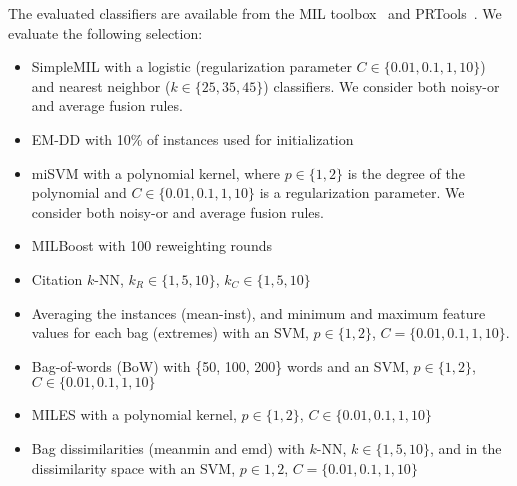 \documentclass[10pt,conference,a4paper]{IEEEtran}
\begin{document}
The evaluated classifiers are available from the MIL toolbox~\cite{MIL2011} and PRTools~\cite{prtools}. We evaluate the following selection:

\begin{itemize}

\item SimpleMIL with a logistic (regularization parameter $C \in \{0.01, 0.1, 1,10\}$) and nearest neighbor ($k \in \{25, 35, 45\}$) classifiers. We consider both noisy-or and average fusion rules.

\item EM-DD with 10\% of instances used for initialization

\item miSVM with a polynomial kernel, where $p \in \{1, 2\}$ is the degree of the polynomial and $C \in \{0.01, 0.1, 1, 10\}$ is a regularization parameter. We consider both noisy-or and average fusion rules.

\item MILBoost with 100 reweighting rounds

\item Citation $k$-NN, $k_R \in \{1, 5, 10\}$, $k_C \in \{1, 5, 10\}$

\item Averaging the instances (mean-inst), and minimum and maximum feature values for each bag (extremes) with an SVM, $p \in \{1, 2\}$, $C=\{0.01, 0.1, 1, 10\}$.

\item Bag-of-words (BoW) with \{50, 100, 200\} words and an SVM, $p \in \{1, 2\}$, $C \in \{0.01, 0.1, 1, 10\}$

\item MILES with a polynomial kernel, $p \in \{1, 2\}$, $C \in \{0.01, 0.1, 1, 10\}$

\item Bag dissimilarities (meanmin and emd) with $k$-NN, $k \in \{1, 5, 10\}$, and in the dissimilarity space with an SVM, $p \in {1, 2}$, $C=\{0.01, 0.1, 1, 10\}$

\end{itemize}
\end{document}

